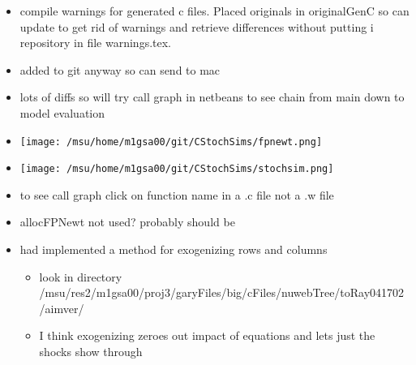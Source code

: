\documentclass[hyperref]{labbook}
\begin{document}
\begin{itemize}


\item compile warnings for generated c files. Placed originals in originalGenC 
so can update to get rid of warnings and retrieve differences without putting i repository in file warnings.tex. 
\item added to git anyway so can send to mac

\item lots of diffs so will try call graph in netbeans to see chain from main down to model evaluation
%
\item \texttt{[image: /msu/home/m1gsa00/git/CStochSims/fpnewt.png]}
\item \texttt{[image: /msu/home/m1gsa00/git/CStochSims/stochsim.png]}
\item to see call graph click on function name in a .c file not a .w file
\item allocFPNewt not used?  probably should be
\item had implemented a method for exogenizing rows and columns
  \begin{itemize}
  \item look in  directory /msu/res2/m1gsa00/proj3/garyFiles/big/cFiles/nuwebTree/toRay041702/aimver/
  \item I think exogenizing zeroes out impact of equations and lets just the shocks show through
  \end{itemize}
\end{itemize}






\end{document}
